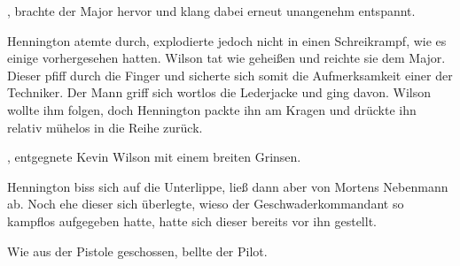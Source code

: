 \par

, brachte der Major hervor und klang dabei erneut unangenehm entspannt. 

\par


\par

Hennington atemte durch, explodierte jedoch nicht in einen Schreikrampf, wie es einige vorhergesehen hatten.  Wilson tat wie geheißen und reichte sie dem Major. Dieser pfiff durch die Finger und sicherte sich somit die Aufmerksamkeit einer der Techniker.  Der Mann griff sich wortlos die Lederjacke und ging davon. Wilson wollte ihm folgen, doch Hennington packte ihn am Kragen und drückte ihn relativ mühelos in die Reihe zurück.

\par


\par

, entgegnete Kevin Wilson mit einem breiten Grinsen. 

\par

Hennington biss sich auf die Unterlippe, ließ dann aber von Mortens Nebenmann ab. Noch ehe dieser sich überlegte, wieso der Geschwaderkommandant so kampflos aufgegeben hatte, hatte sich dieser bereits vor ihn gestellt.

\par

Wie aus der Pistole geschossen, bellte der Pilot. 

\par

